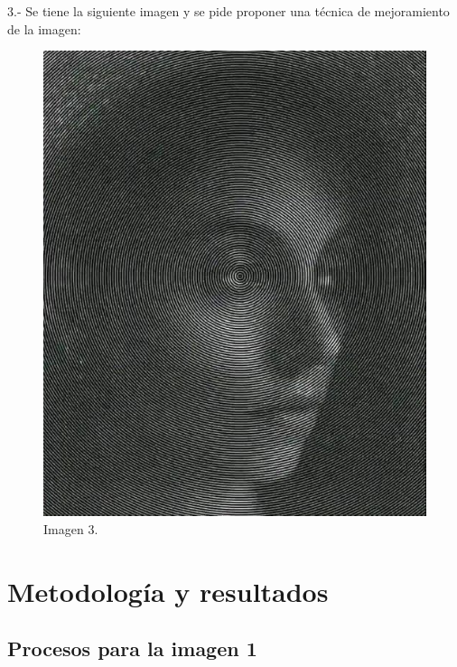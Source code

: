 \documentclass[11pt, letterpaper]{article}
\begin{document}
\newpage

3.- Se tiene la siguiente imagen y se pide proponer una técnica de mejoramiento de la imagen:


\begin{figure}[h!]
	\centering
	\begin{minipage}{0.8\textwidth}
		\centering
		\includegraphics[width=\textwidth]{Imagen3.jpg}
		\caption{Imagen 3.}
		\label{fig:f3}
	\end{minipage}\hfill
\end{figure}



\newpage	
	
\section{Metodología y resultados}

\subsection{Procesos para la imagen 1}
\end{document}
